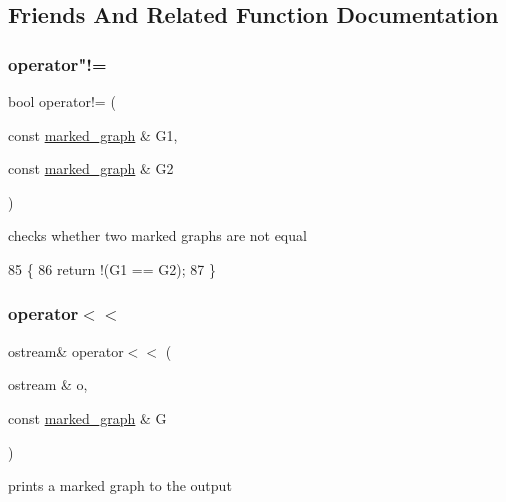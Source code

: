 \subsection{Friends And Related Function Documentation}
\mbox{\label{classmarked__graph_a52ab641f19231908b18f8661bad17493}} 
\subsubsection{\texorpdfstring{operator"!=}{operator!=}}
{\footnotesize\ttfamily bool operator!= (\begin{DoxyParamCaption}\item[{const \hyperlink{classmarked__graph}{marked\+\_\+graph} \&}]{G1,  }\item[{const \hyperlink{classmarked__graph}{marked\+\_\+graph} \&}]{G2 }\end{DoxyParamCaption})\hspace{0.3cm}{\ttfamily [friend]}}



checks whether two marked graphs are not equal 


\begin{DoxyCode}
85 \{
86   \textcolor{keywordflow}{return} !(G1 == G2);
87 \}
\end{DoxyCode}
\mbox{\label{classmarked__graph_a4f98d2df29f50f6da1365a14fd80d764}} 
\subsubsection{\texorpdfstring{operator$<$$<$}{operator<<}}
{\footnotesize\ttfamily ostream\& operator$<$$<$ (\begin{DoxyParamCaption}\item[{ostream \&}]{o,  }\item[{const \hyperlink{classmarked__graph}{marked\+\_\+graph} \&}]{G }\end{DoxyParamCaption})\hspace{0.3cm}{\ttfamily [friend]}}



prints a marked graph to the output 


